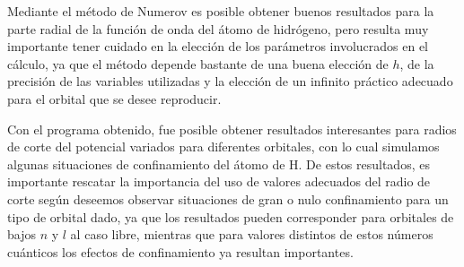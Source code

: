 \documentclass[12pt,a4paper]{report}
\begin{document}
Mediante el método de Numerov es posible obtener buenos resultados para la parte radial de la función de onda del átomo de hidrógeno, pero resulta muy importante tener cuidado en la elección de los parámetros involucrados en el cálculo, ya que el método depende bastante de una buena elección de $h$, de la precisión de las variables utilizadas y la elección de un infinito práctico adecuado para el orbital que se desee reproducir.

Con el programa obtenido, fue posible obtener resultados interesantes para radios de corte del potencial variados para diferentes orbitales, con lo cual simulamos algunas situaciones de confinamiento del átomo de H. De estos resultados, es importante rescatar la importancia del uso de valores adecuados del radio de corte según deseemos observar situaciones de gran o nulo confinamiento para un tipo de orbital dado, ya que los resultados pueden corresponder para orbitales de bajos $n$ y $l$ al caso libre, mientras que para valores distintos de estos números cuánticos los efectos de confinamiento ya resultan importantes.
\end{document}
